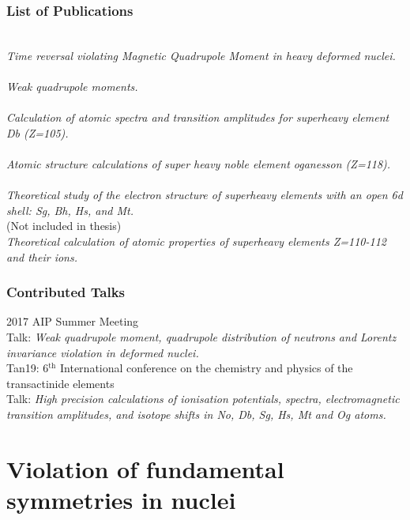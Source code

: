 \documentclass[10pt,a4paper, twoside, openright]{report}
\begin{document}
\section*{List of Publications}
\cite{LFMQM2018}  \\ \textit{Time reversal violating Magnetic Quadrupole Moment in heavy deformed nuclei.} \\
\linebreak 
\cite{LFWQM2018}  \\ \textit{Weak quadrupole moments.} \\
\linebreak
\cite{LDFDb2018}  \\ \textit{Calculation of atomic spectra and transition amplitudes for superheavy element Db (Z=105).} \\
\linebreak	
\cite{LDFOg2018}  \\ \textit{Atomic structure calculations of super heavy noble element oganesson (Z=118).} \\
\linebreak
\cite{LDFSg2019}  \\ \textit{Theoretical study of the electron structure of superheavy elements with an open 6d shell: Sg, Bh, Hs, and Mt.} \\
\linebreak
\cite{LDFDs2019}  (Not included in thesis) \\
\textit{Theoretical calculation of atomic properties of superheavy elements Z=110-112 and their ions.}

\section*{Contributed Talks}
2017 AIP Summer Meeting\\
Talk: \textit{Weak quadrupole moment, quadrupole distribution of neutrons and Lorentz invariance violation in deformed nuclei.}\\
\linebreak
Tan19: 6$^{\text{th}}$ International conference on the chemistry and physics of the transactinide elements \\
Talk: \textit{High precision calculations of ionisation potentials, spectra, electromagnetic transition amplitudes, and isotope shifts in No, Db, Sg, Hs, Mt and Og atoms.}


\part{Violation of  fundamental symmetries in nuclei}
\end{document}
